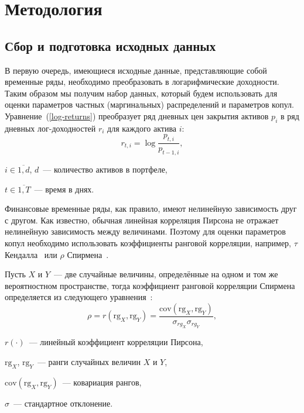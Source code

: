 \section{Методология}
\label{section:methodology}


\subsection{Сбор и подготовка исходных данных} 
\label{methodology:preparing}


В первую очередь, имеющиеся исходные данные, представляющие собой временные ряды, необходимо преобразовать в логарифмические доходности. 
Таким образом мы получим %
набор данных, который %
будем использовать для оценки параметров %
частных (маргинальных) распределений и параметров копул. Уравнение~(\ref{log-returns}) преобразует ряд дневных цен закрытия активов $p_i$ в ряд дневных лог-доходностей $r_i$ для каждого актива $i$:
%
\begin{equation}\label{log-returns}
r_{t,i}=\log \frac{p_{t,i}}{p_{t-1,i}},
\end{equation}
\begin{where}
    \item $i \in \overline{1, d}$, $d$~--- количество активов в портфеле,
    \item $t\in \overline{1, T}$~--- время в днях.
\end{where}

Финансовые временные ряды, %
как правило, имеют нелинейную зависимость друг с другом.
Как известно, обычная линейная корреляция Пирсона не отражает нелинейную зависимость между величинами.
Поэтому для оценки параметров копул необходимо использовать коэффициенты ранговой корреляции, например, $\tau$ Кендалла~\cite{Kendall1970} или $\rho$ Спирмена~\cite{Mye2003}.

Пусть $X$ и $Y$~--- две случайные величины, определённые на одном и том же вероятностном пространстве, тогда коэффициент ранговой корреляции Спирмена определяется из следующего уравнения~\cite{Mye2003}:
\begin{equation}\label{spearman}
\rho = r(\text{rg}_X, \text{rg}_Y) = \frac{\text{cov}(\text{rg}_{X},\text{rg}_{Y})}{\sigma_{rg_X} \sigma_{rg_Y}},
\end{equation}
\begin{where}
    \item $r(\cdot)$~--- линейный коэффициент корреляции Пирсона,
    \item $\text{rg}_X$, $\text{rg}_Y$~--- ранги случайных величин $X$ и $Y$,
    \item $\text{cov} (\text{rg}_{X}, \text{rg}_{Y})$~--- ковариация рангов,
    \item $\sigma$~--- стандартное отклонение.
\end{where}

